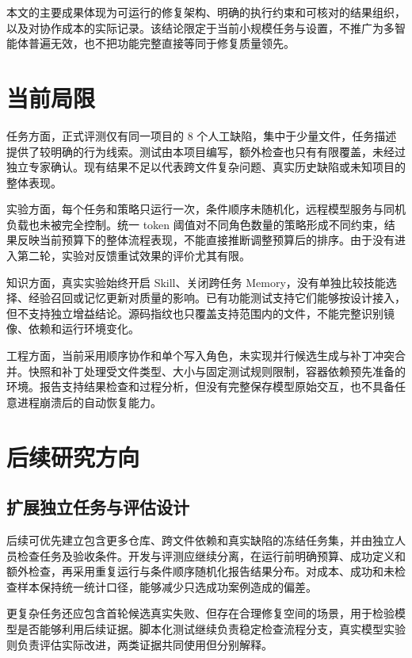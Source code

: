 本文的主要成果体现为可运行的修复架构、明确的执行约束和可核对的结果组织，以及对协作成本的实际记录。该结论限定于当前小规模任务与设置，不推广为多智能体普遍无效，也不把功能完整直接等同于修复质量领先。

\section{当前局限}\label{sec:7.3}

任务方面，正式评测仅有同一项目的 8 个人工缺陷，集中于少量文件，任务描述提供了较明确的行为线索。测试由本项目编写，额外检查也只有有限覆盖，未经过独立专家确认。现有结果不足以代表跨文件复杂问题、真实历史缺陷或未知项目的整体表现。

实验方面，每个任务和策略只运行一次，条件顺序未随机化，远程模型服务与同机负载也未被完全控制。统一 token 阈值对不同角色数量的策略形成不同约束，结果反映当前预算下的整体流程表现，不能直接推断调整预算后的排序。由于没有进入第二轮，实验对反馈重试效果的评价尤其有限。

知识方面，真实实验始终开启 Skill、关闭跨任务 Memory，没有单独比较技能选择、经验召回或记忆更新对质量的影响。已有功能测试支持它们能够按设计接入，但不支持独立增益结论。源码指纹也只覆盖支持范围内的文件，不能完整识别镜像、依赖和运行环境变化。

工程方面，当前采用顺序协作和单个写入角色，未实现并行候选生成与补丁冲突合并。快照和补丁处理受文件类型、大小与固定测试规则限制，容器依赖预先准备的环境。报告支持结果检查和过程分析，但没有完整保存模型原始交互，也不具备任意进程崩溃后的自动恢复能力。

\section{后续研究方向}\label{sec:7.4}

\subsection{扩展独立任务与评估设计}\label{sec:7.4.1}

后续可优先建立包含更多仓库、跨文件依赖和真实缺陷的冻结任务集，并由独立人员检查任务及验收条件。开发与评测应继续分离，在运行前明确预算、成功定义和额外检查，再采用重复运行与条件顺序随机化报告结果分布。对成本、成功和未检查样本保持统一统计口径，能够减少只选成功案例造成的偏差。

更复杂任务还应包含首轮候选真实失败、但存在合理修复空间的场景，用于检验模型是否能够利用后续证据。脚本化测试继续负责稳定检查流程分支，真实模型实验则负责评估实际改进，两类证据共同使用但分别解释。

